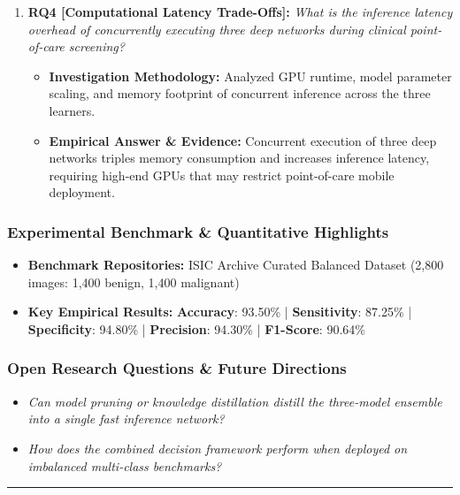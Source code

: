 \begin{enumerate}[label=\textbf{\arabic*.}, leftmargin=*]
\begin{itemize}[leftmargin=1.5em]
  \end{itemize}
  \item \textbf{RQ4 [Computational Latency Trade-Offs]:} \textit{What is the inference latency overhead of concurrently executing three deep networks during clinical point-of-care screening?}
  \begin{itemize}[leftmargin=1.5em]
    \item \textbf{Investigation Methodology:} Analyzed GPU runtime, model parameter scaling, and memory footprint of concurrent inference across the three learners.
    \item \textbf{Empirical Answer \& Evidence:} Concurrent execution of three deep networks triples memory consumption and increases inference latency, requiring high-end GPUs that may restrict point-of-care mobile deployment.
  \end{itemize}
\end{enumerate}

\subsubsection*{Experimental Benchmark \& Quantitative Highlights}
\begin{itemize}[leftmargin=*]
  \item \textbf{Benchmark Repositories:} ISIC Archive Curated Balanced Dataset (2,800 images: 1,400 benign, 1,400 malignant)
  \item \textbf{Key Empirical Results:} \textbf{Accuracy}: 93.50\% \quad | \quad \textbf{Sensitivity}: 87.25\% \quad | \quad \textbf{Specificity}: 94.80\% \quad | \quad \textbf{Precision}: 94.30\% \quad | \quad \textbf{F1-Score}: 90.64\%
\end{itemize}

\subsubsection*{Open Research Questions \& Future Directions}
\begin{itemize}[leftmargin=*]
  \item \textit{Can model pruning or knowledge distillation distill the three-model ensemble into a single fast inference network?}
  \item \textit{How does the combined decision framework perform when deployed on imbalanced multi-class benchmarks?}
\end{itemize}
\vspace{0.8em}\hrule\vspace{1.2em}

